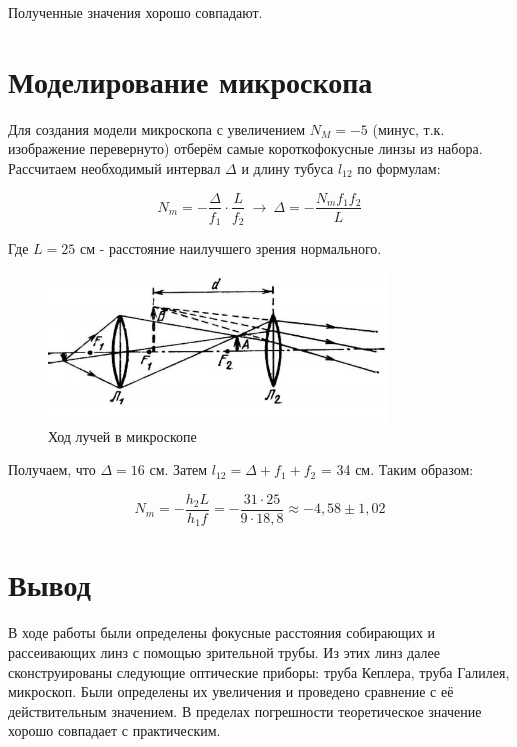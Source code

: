 Полученные значения хорошо совпадают.


\section{Моделирование микроскопа}

Для создания модели микроскопа с увеличением $N_M = -5$ (минус, т.к. изображение перевернуто) отберём самые короткофокусные линзы из набора. 
Рассчитаем необходимый интервал $\Delta$ и длину тубуса  $l_12$ по формулам:

\[ N_m = -\frac{\Delta}{f_1} \cdot \frac{L}{f_2} \: \rightarrow \: \Delta = -\frac{N_m f_1 f_2}{L}  \]


Где $L = 25$ см - расстояние наилучшего зрения нормального. 

\begin{figure}[h!]
    \centering
    \includegraphics[width=9cm]{pics/micro.png}
    \caption{Ход лучей в микроскопе}
    \label{}
\end{figure}


Получаем, что $\Delta = 16$ см. Затем $l_12 = \Delta + f_1 + f_2$ = 34 см.
Таким образом:

\[   N_m = -\frac{h_2 L}{h_1 f} = -\frac{31 \cdot 25}{9 \cdot 18,8} \approx -4,58  \pm 1,02  \]


   
\section{Вывод}
В ходе работы были определены фокусные расстояния собирающих и рассеивающих линз с помощью зрительной трубы. 
\newline
Из этих линз далее сконструированы следующие оптические приборы: труба Кеплера, труба Галилея, микроскоп. 
\newline
Были определены их увеличения и проведено сравнение с её действительным значением. В пределах погрешности теоретическое значение хорошо совпадает с практическим.



